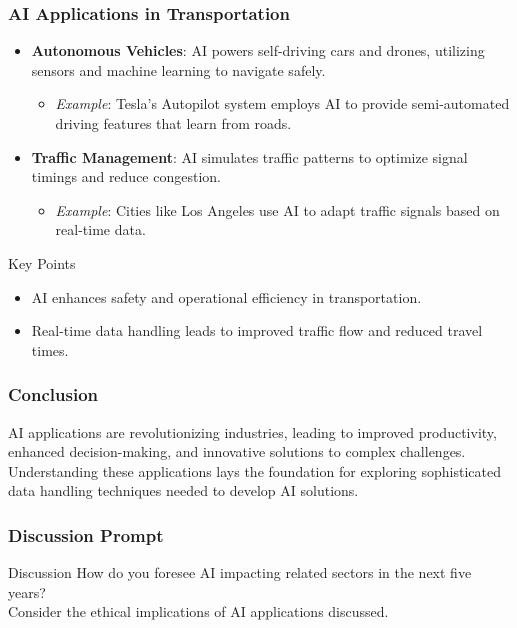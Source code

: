 \documentclass[aspectratio=169]{beamer}
\begin{document}
\begin{frame}[fragile]
    \frametitle{AI Applications in Transportation}
    \begin{itemize}
        \item \textbf{Autonomous Vehicles}: AI powers self-driving cars and drones, utilizing sensors and machine learning to navigate safely.
        \begin{itemize}
            \item \textit{Example}: Tesla's Autopilot system employs AI to provide semi-automated driving features that learn from roads.
        \end{itemize}
        
        \item \textbf{Traffic Management}: AI simulates traffic patterns to optimize signal timings and reduce congestion.
        \begin{itemize}
            \item \textit{Example}: Cities like Los Angeles use AI to adapt traffic signals based on real-time data.
        \end{itemize}
    \end{itemize}
    \begin{block}{Key Points}
        \begin{itemize}
            \item AI enhances safety and operational efficiency in transportation.
            \item Real-time data handling leads to improved traffic flow and reduced travel times.
        \end{itemize}
    \end{block}
\end{frame}

\begin{frame}[fragile]
    \frametitle{Conclusion}
    AI applications are revolutionizing industries, leading to improved productivity, enhanced decision-making, and innovative solutions to complex challenges. 
    Understanding these applications lays the foundation for exploring sophisticated data handling techniques needed to develop AI solutions.
\end{frame}

\begin{frame}[fragile]
    \frametitle{Discussion Prompt}
    \begin{block}{Discussion}
        How do you foresee AI impacting related sectors in the next five years? 
        \\
        Consider the ethical implications of AI applications discussed.
    \end{block}
\end{frame}
\end{document}
